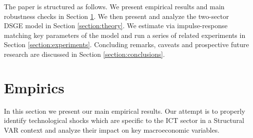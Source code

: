 \documentclass[12pt]{article}
\begin{document}

The paper is structured as follows. We present empirical results and main robustness checks in Section \ref{section:empirics}. We then present and analyze the two-sector DSGE model in Section \ref{section:theory}. We estimate via impulse-response matching key parameters of the model and run a series of related experiments in Section \ref{section:experiments}. Concluding remarks, caveats and prospective future research are discussed in Section \ref{section:conclusions}.



\section{Empirics}\label{section:empirics}

In this section we present our main empirical results. Our attempt is to properly identify technological shocks which are specific to the ICT sector in a Structural VAR context and analyze their impact on key macroeconomic variables.
\end{document}
